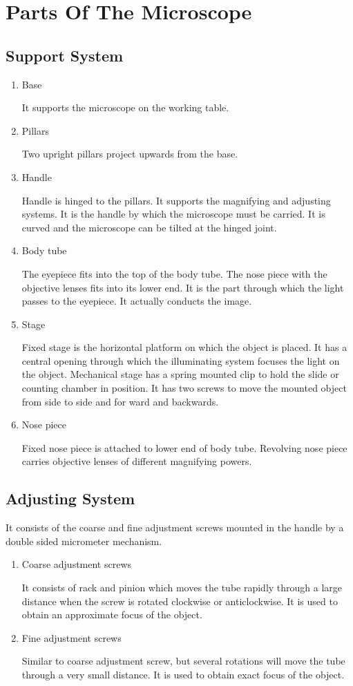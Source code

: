 \documentclass[a4paper,12pt]{book}
\begin{document}
		\section*{Parts Of The Microscope}

		\subsection*{Support System}
		\begin{enumerate}
			\item{Base \par It supports the microscope on the working table.}
			\item{Pillars \par Two upright pillars project upwards from the base.}
			\item{Handle \par Handle is hinged to the pillars. It supports the magnifying and adjusting systems. It is the handle by which the microscope must be carried. It is curved and the microscope can be tilted at the hinged joint.}
			\item{Body tube \par The eyepiece fits into the top of the body tube. The nose piece with the objective lenses fits into its lower end. It is the part through which the light passes to the eyepiece. It actually conducts the image.}
			\item{Stage \par Fixed stage is the horizontal platform on which the object is placed. It has a central opening through which the illuminating system focuses the light on the object. Mechanical stage has a spring mounted clip to hold the slide or counting chamber in position. It has two screws to move the mounted object from side to side and for ward and backwards.}
			\item {Nose piece \par Fixed nose piece is attached to lower end of body tube. Revolving nose piece carries objective lenses of different magnifying powers.}
		\end{enumerate}

		\subsection*{Adjusting System}
		It consists of the coarse and fine adjustment screws mounted in the handle by a double sided micrometer mechanism.
		\begin{enumerate}
			\item{Coarse adjustment screws \par It consists of rack and pinion which moves the tube rapidly through a large distance when the screw is rotated clockwise or anticlockwise. It is used to obtain an approximate focus of the object.}
			\item{Fine adjustment screws \par Similar to coarse adjustment screw, but several rotations will move the tube through a very small distance. It is used to obtain exact focus of the object.}
		\end{enumerate}
\end{document}
